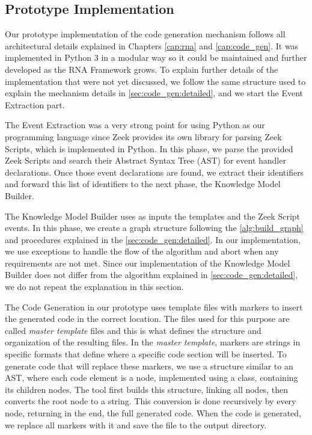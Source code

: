 \subsection{Prototype Implementation}

Our prototype implementation of the code generation mechanism follows all architectural details explained in Chapters \ref{cap:rna} and \ref{cap:code_gen}. It was implemented in Python 3 in a modular way so it could be maintained and further developed as the RNA Framework grows. To explain further details of the implementation that were not yet discussed, we follow the same structure used to explain the mechanism details in \autoref{sec:code_gen:detailed}, and we start the Event Extraction part.

The Event Extraction was a very strong point for using Python as our programming language since Zeek provides its own library for parsing Zeek Scripts, which is implemented in Python. In this phase, we parse the provided Zeek Scripts and search their Abstract Syntax Tree (AST) for event handler declarations. Once those event declarations are found, we extract their identifiers and forward this list of identifiers to the next phase, the Knowledge Model Builder.

The Knowledge Model Builder uses as inputs the templates and the Zeek Script events. In this phase, we create a graph structure following the \autoref{alg:build_graph} and procedures explained in the \autoref{sec:code_gen:detailed}. In our implementation, we use exceptions to handle the flow of the algorithm and abort when any requirements are not met. Since our implementation of the Knowledge Model Builder does not differ from the algorithm explained in \autoref{sec:code_gen:detailed}, we do not repeat the explanation in this section.

The Code Generation in our prototype uses template files with markers to insert the generated code in the correct location. The files used for this purpose are called \textit{master template} files and this is what defines the structure and organization of the resulting files. In the \textit{master template}, markers are strings in specific formats that define where a specific code section will be inserted. To generate code that will replace these markers, we use a structure similar to an AST, where each code element is a node, implemented using a class, containing its children nodes. The tool first builds this structure, linking all nodes, then converts the root node to a string. This conversion is done recursively by every node, returning in the end, the full generated code. When the code is generated, we replace all markers with it and save the file to the output directory.

